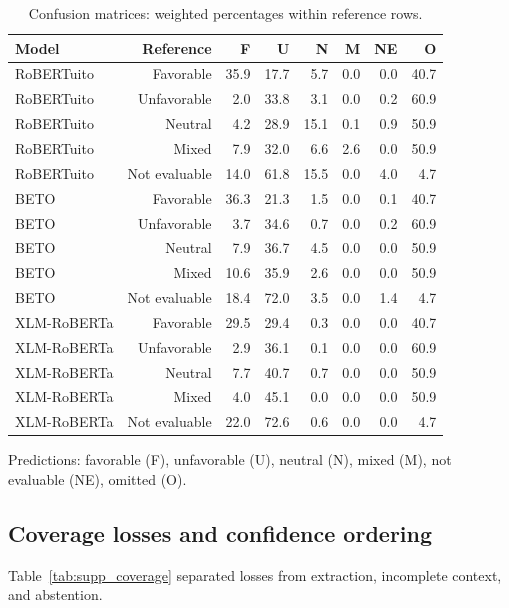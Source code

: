 \documentclass[11pt,a4paper]{article}
\begin{document}
\begin{table}[H]\centering\small
\caption{Confusion matrices: weighted percentages within reference rows.}
\label{tab:supp_confusion}
\setlength{\tabcolsep}{4pt}
\begin{tabular}{lrrrrrrr}\toprule
Model & Reference & F & U & N & M & NE & O\\\midrule
RoBERTuito & Favorable & 35.9 & 17.7 & 5.7 & 0.0 & 0.0 & 40.7\\
RoBERTuito & Unfavorable & 2.0 & 33.8 & 3.1 & 0.0 & 0.2 & 60.9\\
RoBERTuito & Neutral & 4.2 & 28.9 & 15.1 & 0.1 & 0.9 & 50.9\\
RoBERTuito & Mixed & 7.9 & 32.0 & 6.6 & 2.6 & 0.0 & 50.9\\
RoBERTuito & Not evaluable & 14.0 & 61.8 & 15.5 & 0.0 & 4.0 & 4.7\\
BETO & Favorable & 36.3 & 21.3 & 1.5 & 0.0 & 0.1 & 40.7\\
BETO & Unfavorable & 3.7 & 34.6 & 0.7 & 0.0 & 0.2 & 60.9\\
BETO & Neutral & 7.9 & 36.7 & 4.5 & 0.0 & 0.0 & 50.9\\
BETO & Mixed & 10.6 & 35.9 & 2.6 & 0.0 & 0.0 & 50.9\\
BETO & Not evaluable & 18.4 & 72.0 & 3.5 & 0.0 & 1.4 & 4.7\\
XLM-RoBERTa & Favorable & 29.5 & 29.4 & 0.3 & 0.0 & 0.0 & 40.7\\
XLM-RoBERTa & Unfavorable & 2.9 & 36.1 & 0.1 & 0.0 & 0.0 & 60.9\\
XLM-RoBERTa & Neutral & 7.7 & 40.7 & 0.7 & 0.0 & 0.0 & 50.9\\
XLM-RoBERTa & Mixed & 4.0 & 45.1 & 0.0 & 0.0 & 0.0 & 50.9\\
XLM-RoBERTa & Not evaluable & 22.0 & 72.6 & 0.6 & 0.0 & 0.0 & 4.7\\
\bottomrule\end{tabular}
\par\smallskip\footnotesize Predictions: favorable (F), unfavorable (U), neutral (N), mixed (M), not evaluable (NE), omitted (O).
\end{table}

\subsection*{Coverage losses and confidence ordering}

Table~\ref{tab:supp_coverage} separated losses from extraction, incomplete context, and abstention.
\end{document}
